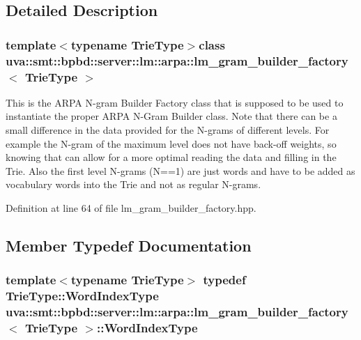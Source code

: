 \subsection{Detailed Description}
\subsubsection*{template$<$typename Trie\+Type$>$class uva\+::smt\+::bpbd\+::server\+::lm\+::arpa\+::lm\+\_\+gram\+\_\+builder\+\_\+factory$<$ Trie\+Type $>$}

This is the A\+R\+P\+A N-\/gram Builder Factory class that is supposed to be used to instantiate the proper A\+R\+P\+A N-\/\+Gram Builder class. Note that there can be a small difference in the data provided for the N-\/grams of different levels. For example the N-\/gram of the maximum level does not have back-\/off weights, so knowing that can allow for a more optimal reading the data and filling in the Trie. Also the first level N-\/grams (N==1) are just words and have to be added as vocabulary words into the Trie and not as regular N-\/grams. 

Definition at line 64 of file lm\+\_\+gram\+\_\+builder\+\_\+factory.\+hpp.



\subsection{Member Typedef Documentation}
\hypertarget{classuva_1_1smt_1_1bpbd_1_1server_1_1lm_1_1arpa_1_1lm__gram__builder__factory_a9ed42c203e3aa56e33abe6f6462e86a6}{}
\subsubsection[{Word\+Index\+Type}]{\setlength{\rightskip}{0pt plus 5cm}template$<$typename Trie\+Type$>$ typedef Trie\+Type\+::\+Word\+Index\+Type {\bf uva\+::smt\+::bpbd\+::server\+::lm\+::arpa\+::lm\+\_\+gram\+\_\+builder\+\_\+factory}$<$ Trie\+Type $>$\+::{\bf Word\+Index\+Type}}\label{classuva_1_1smt_1_1bpbd_1_1server_1_1lm_1_1arpa_1_1lm__gram__builder__factory_a9ed42c203e3aa56e33abe6f6462e86a6}


